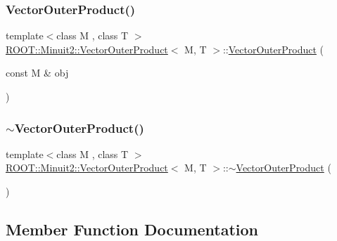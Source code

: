 \subsubsection{\texorpdfstring{VectorOuterProduct()}{VectorOuterProduct()}\hspace{0.1cm}{\footnotesize\ttfamily [2/2]}}
{\footnotesize\ttfamily template$<$class M , class T $>$ \\
\mbox{\hyperlink{classROOT_1_1Minuit2_1_1VectorOuterProduct}{R\+O\+O\+T\+::\+Minuit2\+::\+Vector\+Outer\+Product}}$<$ M, T $>$\+::\mbox{\hyperlink{classROOT_1_1Minuit2_1_1VectorOuterProduct}{Vector\+Outer\+Product}} (\begin{DoxyParamCaption}\item[{const M \&}]{obj }\end{DoxyParamCaption})\hspace{0.3cm}{\ttfamily [inline]}}

\mbox{\label{classROOT_1_1Minuit2_1_1VectorOuterProduct_a866532a01279d52fad9ad3a925eb9660}} 
\subsubsection{\texorpdfstring{$\sim$VectorOuterProduct()}{~VectorOuterProduct()}\hspace{0.1cm}{\footnotesize\ttfamily [2/2]}}
{\footnotesize\ttfamily template$<$class M , class T $>$ \\
\mbox{\hyperlink{classROOT_1_1Minuit2_1_1VectorOuterProduct}{R\+O\+O\+T\+::\+Minuit2\+::\+Vector\+Outer\+Product}}$<$ M, T $>$\+::$\sim$\mbox{\hyperlink{classROOT_1_1Minuit2_1_1VectorOuterProduct}{Vector\+Outer\+Product}} (\begin{DoxyParamCaption}{ }\end{DoxyParamCaption})\hspace{0.3cm}{\ttfamily [inline]}}



\subsection{Member Function Documentation}
\mbox{\label{classROOT_1_1Minuit2_1_1VectorOuterProduct_a9326f6e70b3760159b6b74dded8311d3}} 
